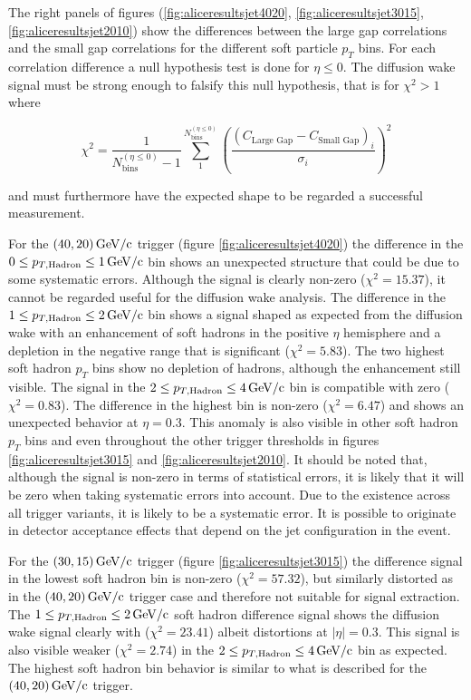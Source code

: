 \documentclass[
  a4paper,
  12pt,
  oneside,
  parskip=half,
  listof=totoc,
  bibliography=totoc,
  DIV=12,
  numbers=noenddot,
  BA.tex
  ]{subfiles}
\begin{document}
The right panels of figures (\ref{fig:aliceresultsjet4020}, \ref{fig:aliceresultsjet3015}, \ref{fig:aliceresultsjet2010}) show the differences between the large gap correlations and the small gap correlations for the different soft particle $p_T$ bins. For each correlation difference a null hypothesis test is done for $\eta \leq 0$. The diffusion wake signal must be strong enough to falsify this null hypothesis, that is for $\chi^2 > 1$ where 

\begin{equation}
	\chi^2 = \frac{1}{N_\text{bins}^{(\eta \leq 0)} - 1} \sum_{1}^{N_\text{bins}^{(\eta \leq 0)}} \left( \frac{(C_\text{Large Gap} - C_\text{Small Gap})_i}{\sigma_i} \right)^2
\end{equation}

and must furthermore have the expected shape to be regarded a successful measurement.

For the $(40,20)\bunit{GeV/c}$ trigger (figure \ref{fig:aliceresultsjet4020}) the difference in the $0 \leq p_{T,\text{Hadron}} \leq 1 \bunit{GeV/c}$ bin shows an unexpected structure that could be due to some systematic errors. Although the signal is clearly non-zero ($\chi^2 = 15.37$), it cannot be regarded useful for the diffusion wake analysis. The difference in the $1 \leq p_{T,\text{Hadron}} \leq 2 \bunit{GeV/c}$ bin shows a signal shaped as expected from the diffusion wake with an enhancement of soft hadrons in the positive $\eta$ hemisphere and a depletion in the negative range that is significant ($\chi^2 = 5.83$). The two highest soft hadron $p_T$ bins show no depletion of hadrons, although the enhancement still visible. The signal in the $2 \leq p_{T,\text{Hadron}} \leq 4 \bunit{GeV/c}$ bin is compatible with zero ($\chi^2 = 0.83$). The difference in the highest bin is non-zero ($\chi^2 = 6.47$) and shows an unexpected behavior at $\eta = 0.3$. This anomaly is also visible in other soft hadron $p_T$ bins and even throughout the other trigger thresholds in figures \ref{fig:aliceresultsjet3015} and \ref{fig:aliceresultsjet2010}. It should be noted that, although the signal is non-zero in terms of statistical errors, it is likely that it will be zero when taking systematic errors into account. Due to the existence across all trigger variants, it is likely to be a systematic error. It is possible to originate in detector acceptance effects that depend on the jet configuration in the event.

For the $(30,15)\bunit{GeV/c}$ trigger (figure \ref{fig:aliceresultsjet3015}) the difference signal in the lowest soft hadron bin is non-zero ($\chi^2 = 57.32$), but similarly distorted as in the $(40,20)\bunit{GeV/c}$ trigger case and therefore not suitable for signal extraction. The $1 \leq p_{T,\text{Hadron}} \leq 2 \bunit{GeV/c}$ soft hadron difference signal shows the diffusion wake signal clearly with ($\chi^2 = 23.41$) albeit distortions at $|\eta| = 0.3$. This signal is also visible weaker ($\chi^2 = 2.74$) in the $2 \leq p_{T,\text{Hadron}} \leq 4 \bunit{GeV/c}$ bin as expected. The highest soft hadron bin behavior is similar to what is described for the $(40,20)\bunit{GeV/c}$ trigger.
\end{document}
